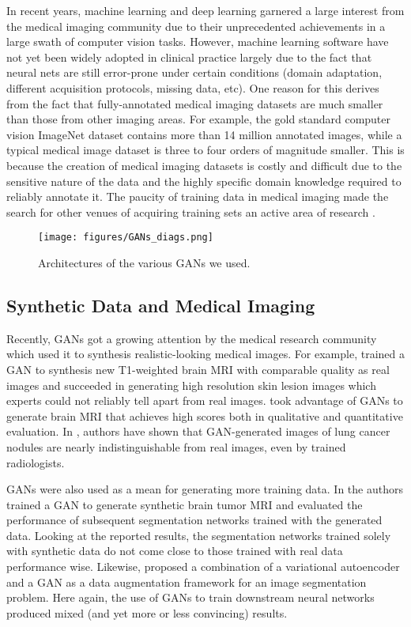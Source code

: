 \documentclass[preprint,12pt, authoryear]{elsarticle}
\begin{document}
In recent years, machine learning and deep learning garnered a large interest from the medical imaging community due to their unprecedented achievements in a large swath of computer vision tasks.  However, machine learning software have not yet been widely adopted in clinical practice largely due to the fact that neural nets are still error-prone under certain conditions (domain adaptation, different acquisition protocols, missing data, etc).  One reason for this derives from the fact that fully-annotated medical imaging datasets are much smaller than those from other imaging areas.  For example, the gold standard computer vision ImageNet \citep{deng2009imagenet} dataset contains more than 14 million annotated images, while a typical medical image dataset is three to four orders of magnitude smaller. This is because the creation of medical imaging datasets is costly and difficult due to the sensitive nature of the data and the highly specific domain knowledge required to reliably annotate it.
The paucity of training data in medical imaging made the search for other venues of acquiring training sets an active area of research \citep{Frangi2018SimulationAS}.

\begin{figure*}[ht]
\centering
\texttt{[image: figures/GANs\_diags.png]}
\caption{\small Architectures of the various GANs we used.}
\label{fig_gans_architecture}
\end{figure*}

\subsection{Synthetic Data and Medical Imaging}
Recently, GANs got a growing attention by the medical research community which used it to synthesis realistic-looking medical images. For example, \cite{Bermudez2018LearningIB} trained a GAN to synthesis new T1-weighted brain MRI with comparable quality as real images and \cite{Baur2018GeneratingHR} succeeded in generating high resolution skin lesion images which experts could not reliably tell apart from real images. \cite{calimeri2017biomedical} took advantage of GANs to generate brain MRI that achieves high scores both in qualitative and quantitative evaluation. In \cite{Chuquicusma2018HowTF}, authors have shown that GAN-generated images of lung cancer nodules are nearly indistinguishable from real images, even by trained radiologists. 

GANs were also used as a mean for generating more training data. In \cite{Shin2018MedicalIS} the authors trained a GAN to generate synthetic brain tumor MRI and evaluated the performance of subsequent segmentation networks trained with the generated data. Looking at the reported results, the segmentation networks trained solely with synthetic data do not come close to those trained with real data performance wise. Likewise, \cite{Skandarani2020OnTE} proposed a combination of a variational autoencoder and a GAN as a data augmentation framework for an image segmentation problem.  Here again, the use of GANs to train downstream neural networks produced mixed (and yet more or less convincing) results.
\end{document}
